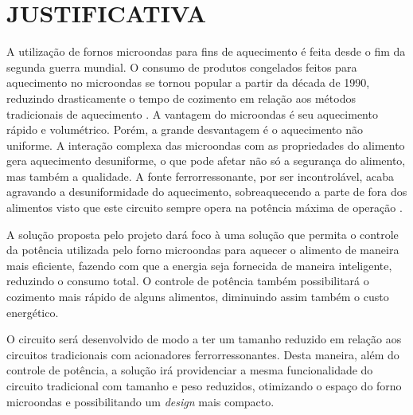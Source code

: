 \section{JUSTIFICATIVA}
\label{sec:justificativa}

A utilização de fornos microondas para fins de aquecimento é feita desde o fim da segunda guerra mundial. O consumo de produtos congelados feitos para aquecimento no microondas se tornou popular a partir da década de 1990, reduzindo drasticamente o tempo de cozimento em relação aos métodos tradicionais de aquecimento \cite{Ohlsson}. A vantagem do microondas é seu aquecimento rápido e volumétrico. Porém, a grande desvantagem é o aquecimento não uniforme. A interação complexa das microondas com as propriedades do alimento gera aquecimento desuniforme, o que pode afetar não só a segurança do alimento, mas também a qualidade. A fonte ferrorressonante, por ser incontrolável, acaba agravando a desuniformidade do aquecimento, sobreaquecendo a parte de fora dos alimentos visto que este circuito sempre opera na potência máxima de operação \cite{Ma}.

A solução proposta pelo projeto dará foco à uma solução que permita o controle da potência utilizada pelo forno microondas para aquecer o alimento de maneira mais eficiente, fazendo com que a energia seja fornecida de maneira inteligente, reduzindo o consumo total. O controle de potência também possibilitará o cozimento mais rápido de alguns alimentos, diminuindo assim também o custo energético.

O circuito será desenvolvido de modo a ter um tamanho reduzido em relação aos circuitos tradicionais com acionadores ferrorressonantes. Desta maneira, além do controle de potência, a solução irá providenciar a mesma funcionalidade do circuito tradicional com tamanho e peso reduzidos, otimizando o espaço do forno microondas e possibilitando um \textit{design} mais compacto.
